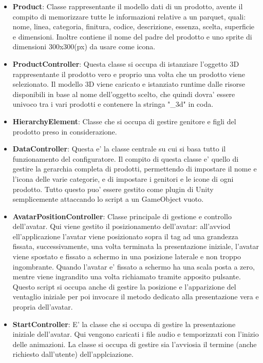 \begin{itemize}
	\item \textbf{Product}: Classe rappresentante il modello dati di un prodotto, avente il compito di memorizzare tutte le informazioni relative a un parquet, quali: nome, linea, categoria, finitura, codice, descrizione, essenza, scelta, superficie e dimensioni. Inoltre contiene il nome del padre del prodotto e uno sprite di dimensioni 300x300(px) da usare come icona.
	
	\item \textbf{ProductController}: Questa classe si occupa di istanziare l'oggetto 3D rappresentante il prodotto vero e proprio una volta che un prodotto viene selezionato. Il modello 3D viene caricato e istanziato runtime dalle risorse disponibili in base al nome dell'oggetto scelto, che quindi dovra' essere univoco tra i vari prodotti e contenere la stringa "\_3d" in coda.
	
	\item \textbf{HierarchyElement}: Classe che si occupa di gestire genitore e figli del prodotto preso in considerazione.
	
	\item \textbf{DataController}: Questa e' la classe centrale su cui si basa tutto il funzionamento del configuratore. Il compito di questa classe e' quello di gestire la gerarchia completa di prodotti, permettendo di impostare il nome e l'icona delle varie categorie, e di impostare i genitori e le icone di ogni prodotto. Tutto questo puo' essere gestito come plugin di Unity semplicemente attaccando lo script a un GameObject vuoto.
	
	\item \textbf{AvatarPositionController}: Classe principale di gestione e controllo dell'avatar. Qui viene gestito il posizionamento dell'avatar: all'avviod ell'applicazione l'avatar viene posizionato sopra il tag ad una grandezza fissata, successivamente, una volta terminata la presentazione iniziale, l'avatar viene spostato e fissato a schermo in una posizione laterale e non troppo ingombrante. Quando l'avatar e' fissato a schermo ha una scala posta a zero, mentre viene ingrandito una volta richiamato tramite apposito pulsante. Questo script si occupa anche di gestire la posizione e l'apparizione del ventaglio iniziale per poi invocare il metodo dedicato alla presentazione vera e propria dell'avatar.
	
	\item \textbf{StartController}: E' la classe che si occupa di gestire la presentazione iniziale dell'avatar. Qui vengono caricati i file audio e temporizzati con l'inizio delle animazioni. La classe si occupa di gestire sia l'avviosia il termine (anche richiesto dall'utente) dell'applciazione.
	

\end{itemize}
